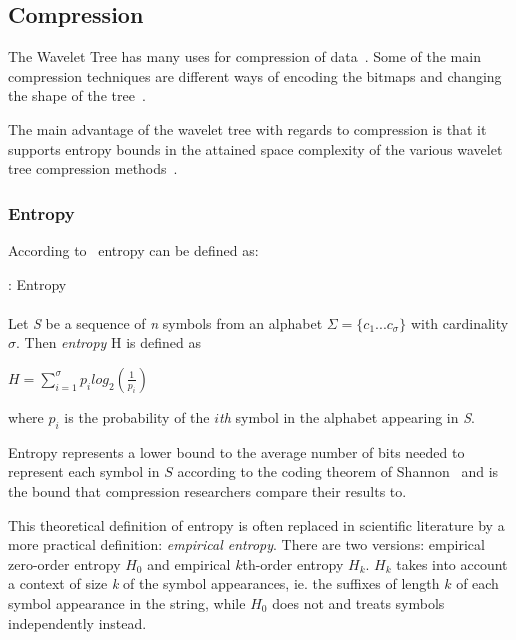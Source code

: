 \subsection{Compression}
The Wavelet Tree has many uses for compression of data~.
Some of the main compression techniques are different ways of encoding the bitmaps and changing the shape of the tree~.

The main advantage of the wavelet tree with regards to compression is that it supports entropy bounds in the attained space complexity of the various wavelet tree compression methods~.

\subsubsection{Entropy}
According to~ entropy can be defined as:

\begin{mdframed}[nobreak, linecolor=lightgray, linewidth=2pt]
\begin{definition}: Entropy \\\\
Let \textit{S} be a sequence of \textit{n} symbols from an alphabet $\Sigma = \lbrace c_1 ... c_\sigma \rbrace$ with cardinality $\sigma$.
Then \textit{entropy} H is defined as
\begin{center}
$H = \sum_{i=1}^{\sigma} p_i log_2(\frac{1}{p_i})$
\end{center}
where $p_i$ is the probability of the $i$\emph{th} symbol in the alphabet appearing in \textit{S}.
\end{definition} 
\end{mdframed}

Entropy represents a lower bound to the average number of bits needed to represent each symbol in $S$ according to the coding theorem of Shannon~ and is the bound that compression researchers compare their results to.

This theoretical definition of entropy is often replaced in scientific literature by a more practical definition: \textit{empirical entropy}.
There are two versions: empirical zero-order entropy $H_0$ and empirical $k$th-order entropy $H_k$. $H_k$ takes into account a context of size \textit{k} of the symbol appearances, ie. the suffixes of length $k$ of each symbol appearance in the string, while $H_0$ does not and treats symbols independently instead. 

